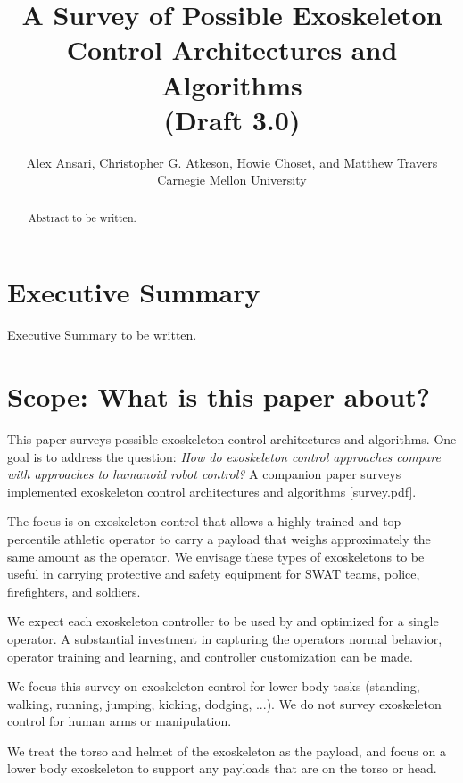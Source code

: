\documentclass[letterpaper,12pt,fullpage]{article}
\begin{document}
\title{A Survey of Possible Exoskeleton Control Architectures and
Algorithms\\
(Draft 3.0)}

\author{Alex Ansari, Christopher G. Atkeson, Howie Choset, and Matthew Travers\\
Carnegie Mellon University}

\maketitle

\begin{abstract}
Abstract to be written.
\end{abstract}

\section{Executive Summary}

Executive Summary to be written.

\section{Scope: What is this paper about?}

This paper surveys possible exoskeleton control architectures and
algorithms.
One goal is to address the question:
{\it How do exoskeleton control approaches compare with 
approaches to humanoid robot control?}
A companion paper surveys implemented exoskeleton control architectures
and algorithms [survey.pdf].

The focus is on exoskeleton control that allows a
highly trained and top percentile athletic 
operator to carry a payload that weighs approximately the same amount
as the operator. We envisage these types of exoskeletons to be useful
in carrying protective and safety equipment for SWAT teams, police,
firefighters, and soldiers. 

We expect each exoskeleton controller
to be used by and optimized for a single operator.
A substantial investment in capturing the operators normal behavior,
operator training and learning, and controller customization can be made.

We focus this survey on exoskeleton control for lower body tasks (standing, walking,
running, jumping, kicking, dodging, ...).
We do not survey exoskeleton control for human arms or manipulation. 

We treat the torso and helmet of the exoskeleton as the payload,
and focus on a lower body exoskeleton to support any payloads that
are on the torso or head.
\end{document}
